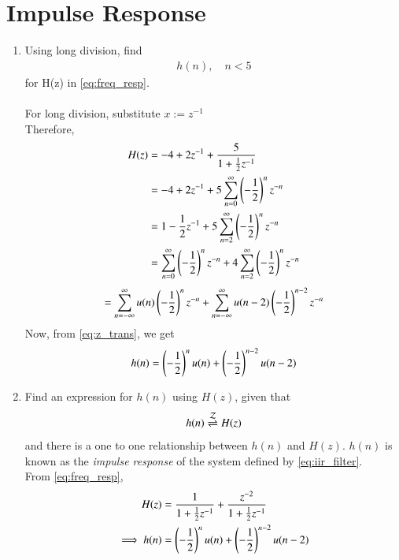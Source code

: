 \documentclass[journal,12pt,twocolumn]{IEEEtran}
\renewcommand\thesection{\arabic{section}}
\begin{document}
\section{Impulse Response}
\begin{enumerate}[label=\thesection.\arabic*]
	\item Using long division, find
\begin{align}
    h(n), \quad n < 5
\end{align}
for H(z) in 
\eqref{eq:freq_resp}.\\
\\
\solution For long division, substitute $x := z^{-1}$
\\
Therefore,
\begin{align}
 H(z) &= -4 + 2z^{-1} + \frac{5}{1 + \frac{1}{2}z^{-1}} \\
   &= -4 + 2z^{-1} + 5\sum_{n = 0}^{\infty}\left(-\frac{1}{2}\right)^nz^{-n} \\
   &= 1 - \frac{1}{2}z^{-1} + 5\sum_{n = 2}^{\infty}\left(-\frac{1}{2}\right)^nz^{-n} \\
   &= \sum_{n = 0}^{\infty}\left(-\frac{1}{2}\right)^nz^{-n} + 4\sum_{n = 2}^{\infty}\left(-\frac{1}{2}\right)^nz^{-n} 
   \end{align}
   \begin{equation}
       = \sum_{n = -\infty}^{\infty}u(n)\left(-\frac{1}{2}\right)^nz^{-n} + \sum_{n = -\infty}^{\infty}u(n - 2)\left(-\frac{1}{2}\right)^{n - 2}z^{-n}
   \end{equation}   
Now, from \eqref{eq:z_trans}, we get
\begin{align}
 h(n) = \left(-\frac{1}{2}\right)^{n}u(n) + \left(-\frac{1}{2}\right)^{n-2}u(n-2)
\end{align}
\item \label{prob:impulse_resp}
Find an expression for $h(n)$ using $H(z)$, given that 
\begin{equation}
\label{eq:impulse_resp}
h(n) \overset{\mathcal{Z}}{ \rightleftharpoons} H(z)
\end{equation}
and there is a one to one relationship between $h(n)$ and $H(z)$. $h(n)$ is known as the {\em impulse response} of the
system defined by \eqref{eq:iir_filter}.
\\
\solution From \eqref{eq:freq_resp},
\begin{align}
H(z) &= \frac{1}{1 + \frac{1}{2}z^{-1}} + \frac{ z^{-2}}{1 + \frac{1}{2}z^{-1}}
\\
\implies h(n) &= \brak{-\frac{1}{2}}^{n}u(n) + \brak{-\frac{1}{2}}^{n-2}u(n-2)

\end{align}
\end{enumerate}
\end{document}
